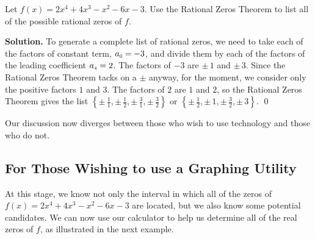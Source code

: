 \begin{ex}  Let $f(x) = 2x^4+4x^3-x^2-6x-3$. Use the Rational Zeros Theorem to list all of the possible rational zeros of $f$.

\smallskip

{\bf Solution.}  To generate a complete list of rational zeros, we need to take each of the factors of constant term, $a_{\mbox{\tiny$0$}} = -3$, and divide them by each of the factors of the leading coefficient $a_{\mbox{\tiny$4$}} = 2$.  The factors of $-3$ are $\pm \, 1$ and $\pm \, 3$.  Since the Rational Zeros Theorem tacks on a $\pm$ anyway, for the moment, we consider only the positive factors $1$ and $3$.  The factors of $2$ are  $1$ and $2$, so the Rational Zeros Theorem gives the list $\left\{\pm \, \frac{1}{1}, \pm \, \frac{1}{2},  \pm \, \frac{3}{1}, \pm \, \frac{3}{2}\right\}$ or $\left\{\pm \, \frac{1}{2}, \pm \, 1, \pm \, \frac{3}{2}, \pm \, 3\right\}$. \qed
\label{RZTex}
\end{ex}

Our discussion now diverges between those who wish to use technology and those who do not.  

\subsection{For Those Wishing to use a Graphing Utility}

At this stage, we know not only the interval in which all of the zeros of $f(x) = 2x^4+4x^3-x^2-6x-3$ are located, but we also know some potential candidates.  We can now use our calculator to help us determine all of the real zeros of $f$, as illustrated in the next example.

